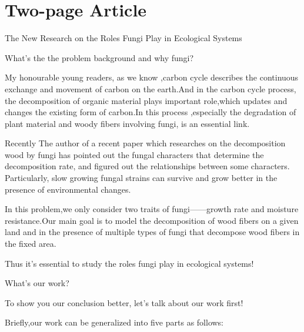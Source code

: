 \documentclass[12pt]{article}
\begin{document}
\section{Two-page Article}
\begin{center}
	{\huge The New Research on the Roles Fungi Play in Ecological Systems}
\end{center}


What’s the the problem background and why fungi?\par 
My honourable young readers, as we know ,carbon cycle describes the continuous exchange and movement of carbon on the earth.And in the carbon cycle process, the decomposition of organic material plays important role,which updates and changes the existing form of carbon.In this process ,especially the degradation of plant material and woody fibers involving fungi, is an essential link.\par 
Recently The author of a recent paper which researches on the decomposition wood by fungi has pointed out  the fungal characters that determine the decomposition rate, and figured out the relationships between some characters. Particularly, slow growing fungal strains can survive and grow better in the presence of environmental changes.\par 
In this problem,we only consider two traits of fungi——growth rate and moisture resistance.Our main goal is to model the decomposition of wood fibers on a given land and in the presence of multiple types of fungi that decompose wood fibers in the fixed area.\par 
Thus it’s essential to study the roles fungi play in ecological systems!\par 


What’s our work?\par 
To show you our conclusion better, let's talk about our work first!\par 
Briefly,our work can be generalized into five parts as follows:\par 
\end{document}
